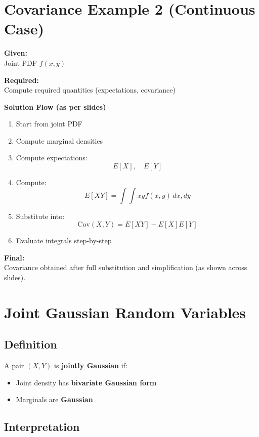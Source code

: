 \documentclass[12pt]{article}
\begin{document}
\section{Covariance Example 2 (Continuous Case)}

\textbf{Given:} \\
Joint PDF $f(x,y)$

\textbf{Required:} \\
Compute required quantities (expectations, covariance)

\textbf{Solution Flow (as per slides)}

\begin{enumerate}
    \item Start from joint PDF
    \item Compute marginal densities
    \item Compute expectations:
    \[
    E[X], \quad E[Y]
    \]
    \item Compute:
    \[
    E[XY] = \int \int xy f(x,y) \, dx,dy
    \]
    \item Substitute into:
    \[
    \text{Cov}(X,Y) = E[XY] - E[X]E[Y]
    \]
    \item Evaluate integrals step-by-step
\end{enumerate}

\textbf{Final:} \\
Covariance obtained after full substitution and simplification (as shown across slides).

\section{Joint Gaussian Random Variables}

\subsection*{Definition}

A pair $(X, Y)$ is \textbf{jointly Gaussian} if:
\begin{itemize}
    \item Joint density has \textbf{bivariate Gaussian form}
    \item Marginals are \textbf{Gaussian}
\end{itemize}

\subsection*{Interpretation}
\end{document}
